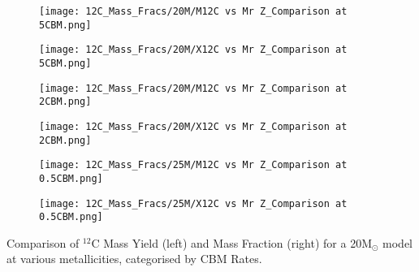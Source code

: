 \begin{minipage}{\textwidth}
	\centering
	\begin{subfigure}{0.49\textwidth}
		\texttt{[image: 12C\_Mass\_Fracs/20M/M12C vs Mr Z\_Comparison at 5CBM.png]}
	\end{subfigure}
        \hfill
	\begin{subfigure}{0.49\textwidth}
		\texttt{[image: 12C\_Mass\_Fracs/20M/X12C vs Mr Z\_Comparison at 5CBM.png]}
	\end{subfigure}
        \label{fig:12C_20M_5CBM}
\end{minipage}
\begin{minipage}{\textwidth}
	\centering
	\begin{subfigure}{0.49\textwidth}
		\texttt{[image: 12C\_Mass\_Fracs/20M/M12C vs Mr Z\_Comparison at 2CBM.png]}
	\end{subfigure}
        \hfill
	\begin{subfigure}{0.49\textwidth}
		\texttt{[image: 12C\_Mass\_Fracs/20M/X12C vs Mr Z\_Comparison at 2CBM.png]}
	\end{subfigure}
        \label{fig:12C_20M_2CBM}
\end{minipage}
\begin{minipage}{\textwidth}
	\centering
	\begin{subfigure}{0.49\textwidth}
		\texttt{[image: 12C\_Mass\_Fracs/25M/M12C vs Mr Z\_Comparison at 0.5CBM.png]}
	\end{subfigure}
        \hfill
	\begin{subfigure}{0.49\textwidth}
		\texttt{[image: 12C\_Mass\_Fracs/25M/X12C vs Mr Z\_Comparison at 0.5CBM.png]}
	\end{subfigure}
	 \caption{Comparison of $^{12}$C Mass Yield (left) and Mass Fraction (right) for a 20M$_\odot$ model at various metallicities, categorised by CBM Rates.}
        \label{fig:12C_20M_0.5CBM}
\end{minipage}

